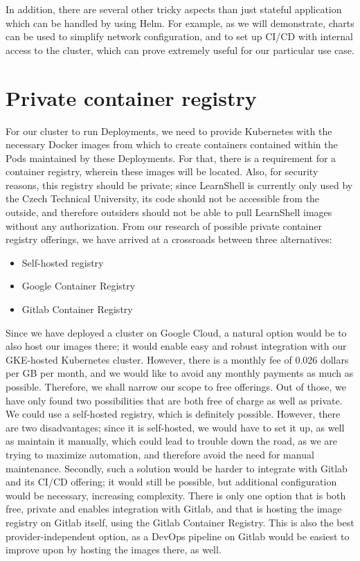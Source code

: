 \documentclass[thesis=B,english]{FITthesis}[2019/12/23]
\begin{document}
In addition, there are several other tricky aspects than just stateful application which can be handled by using Helm. For example, as we will demonstrate, charts can be used to simplify network configuration, and to set up CI/CD with internal access to the cluster, which can prove extremely useful for our particular use case.


\section{Private container registry}

For our cluster to run Deployments, we need to provide Kubernetes with the necessary Docker images from which to create containers contained within the Pods maintained by these Deployments. For that, there is a requirement for a container registry, wherein these images will be located. Also, for security reasons, this registry should be private; since LearnShell is currently only used by the Czech Technical University, its code should not be accessible from the outside, and therefore outsiders should not be able to pull LearnShell images without any authorization. From our research of possible private container registry offerings, we have arrived at a crossroads between three alternatives:

\begin{itemize}
  \setlength\itemsep{0em}
  \item Self-hosted registry
  \item Google Container Registry
  \item Gitlab Container Registry
\end{itemize}

Since we have deployed a cluster on Google Cloud, a natural option would be to also host our images there; it would enable easy and robust integration with our GKE-hosted Kubernetes cluster. However, there is a monthly fee of 0.026 dollars per GB per month, and we would like to avoid any monthly payments as much as possible. \cite{gcr-pricing} Therefore, we shall narrow our scope to free offerings. Out of those, we have only found two possibilities that are both free of charge as well as private. We could use a self-hosted registry, which is definitely possible. However, there are two disadvantages; since it is self-hosted, we would have to set it up, as well as maintain it manually, which could lead to trouble down the road, as we are trying to maximize automation, and therefore avoid the need for manual maintenance. Secondly, such a solution would be harder to integrate with Gitlab and its CI/CD offering; it would still be possible, but additional configuration would be necessary, increasing complexity. There is only one option that is both free, private and enables integration with Gitlab, and that is hosting the image registry on Gitlab itself, using the Gitlab Container Registry. This is also the best provider-independent option, as a DevOps pipeline on Gitlab would be easiest to improve upon by hosting the images there, as well.
\end{document}
